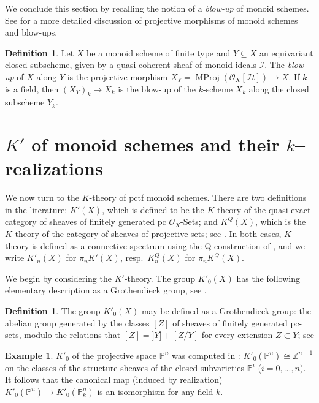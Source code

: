 \documentclass[12pt]{amsart}
\newcommand{\pc}{{\mathrm{pc}}}
\def\cI{\mathcal I}
\def\KQ{K^Q}
\newcommand{\Z}{\mathbb{Z}}
\newcommand{\bbP}{\mathbb{P}}
\def\MProj{\operatorname{MProj}}
\numberwithin{equation}{section}
\theoremstyle{plain}
\theoremstyle{definition}
\newtheorem{defn}[equation]{Definition}
\newtheorem{ex}[equation]{Example}
\theoremstyle{remark}
\begin{document}
We conclude this section by recalling the notion of a {\it blow-up} of
monoid schemes. See \cite[Section 7]{CHWW} for a more detailed
discussion of projective morphisms of monoid schemes and blow-ups.

\begin{defn}\label{def:blowup}
Let $X$ be a monoid scheme of finite type and $Y \subseteq X$ an
equivariant closed subscheme, given by a quasi-coherent sheaf of monoid
ideals $\cI$. The {\it blow-up} of $X$ along $Y$ is the
projective morphism $X_Y=\MProj(\mathcal{O}_X[\cI t])\to X$.
If $k$ is a field, then $(X_Y)_k\to X_k$ is the
blow-up of the $k$-scheme $X_k$ along the closed subscheme $Y_k$.
\end{defn}


\section{$K'$ of monoid schemes and their $k$--realizations}
\label{sec:higher-K}

We now turn to the $K$-theory of pctf monoid schemes.
There are two definitions in the literature:
$K'(X)$, which is defined to be the $K$-theory of
the quasi-exact category of sheaves of finitely
generated $\pc$ $\mathcal{O}_X$-Sets; and $\KQ(X)$,
which is the $K$-theory
of the category of sheaves of projective sets; see \cite{HW,ELY}.  In
both cases, $K$-theory is defined as a connective spectrum using the
Q-construction of \cite{Quillen}, and we write $K'_n(X)$ for $\pi_n
K'(X)$, resp.\, $\KQ_n(X)$ for $\pi_n \KQ(X)$.

We begin by considering the $K'$-theory. The group $K'_0(X)$ has the following
elementary description  as a Grothendieck group, see \cite{HW}.


\begin{defn}
The group $K'_0(X)$ may be defined as a Grothendieck group: the abelian
group generated by the classes $[Z]$ of sheaves of finitely generated
$\pc$-sets, modulo the relations
that $[Z]=]Y]+[Z/Y]$ for every extension $Z\subset Y$;
	see \cite[2.1]{HW}
\end{defn}

\begin{ex}\label{ex:proj-space-K}
  $K'_0$ of the projective space $\bbP^n$ was computed in \cite[5.7]{HW}:
  $K'_0(\bbP^n)\cong \Z^{n+1}$ on the classes of the structure sheaves
  of the closed	subvarieties $\bbP^i$ ($i=0,...,n$). 
  It follows that the canonical map (induced by realization)
  $K'_0(\bbP^n) \to K'_0(\bbP^n_k)$ is an isomorphism for any field $k$.
\end{ex}
\end{document}
